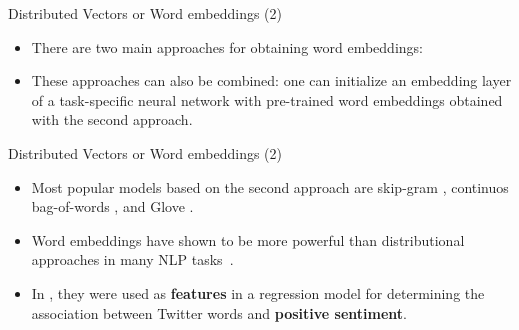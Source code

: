 \documentclass[handout]{beamer}
\begin{document}
\begin{frame}{Distributed Vectors or Word embeddings (2)}
\begin{scriptsize}
\begin{itemize}

\item There are two main approaches for obtaining word embeddings:

\begin{enumerate}
\end{enumerate}


\item These approaches can also be combined: one can initialize an embedding layer of a task-specific neural network with pre-trained word embeddings obtained with the second approach.

\end{itemize}
\end{scriptsize}
\end{frame}


\begin{frame}{Distributed Vectors or Word embeddings (2)}
\begin{scriptsize}
\begin{itemize}


\item Most popular models based on the second approach are skip-gram \cite{Mikolov2013}, continuos bag-of-words \cite{Mikolov2013}, and Glove \cite{penningtonSM14}.

\item Word embeddings have shown to be more powerful than distributional approaches in many NLP tasks~\cite{baroni2014don}.

\item In \cite{amir2015SemEval}, they were used as \textbf{features} in a regression model for determining the association between Twitter words and \textbf{positive sentiment}. 

\end{itemize}
\end{scriptsize}
\end{frame}
\end{document}
